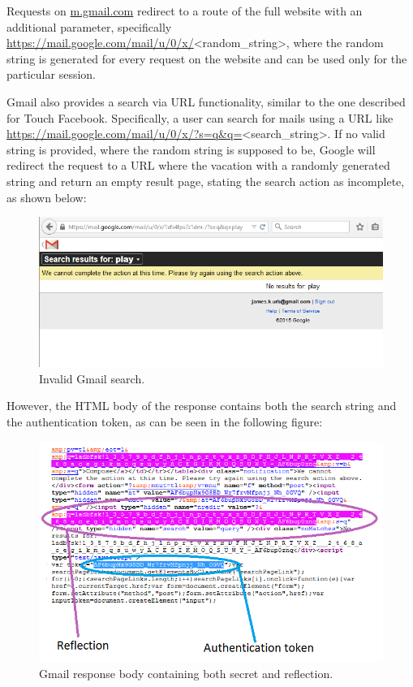 Requests on \url{m.gmail.com} redirect to a route of the full website with an
additional parameter, specifically
\url{https://mail.google.com/mail/u/0/x/}<random\_string>, where the random
string is generated for every request on the website and can be used only for
the particular session.

Gmail also provides a search via URL functionality, similar to the one described
for Touch Facebook. Specifically, a user can search for mails using a URL like
    \url{https://mail.google.com/mail/u/0/x/?s=q&q=}<search\_string>. If no
    valid string is provided, where the random string is supposed to be, Google
    will redirect the request to a URL where the vacation with a randomly
    generated string and return an empty result page, stating the search action
    as incomplete, as shown below:

\begin{figure}[H] \caption{Invalid Gmail search.} \centering
\includegraphics[width=1\textwidth]{diagrams/gmail_search.png}\end{figure}

However, the HTML body of the response contains both the search string and the
authentication token, as can be seen in the following figure:

\begin{figure}[H] \caption{Gmail response body containing both secret and
reflection.} \centering
\includegraphics[width=1\textwidth]{diagrams/gmail_response.png}\end{figure}

